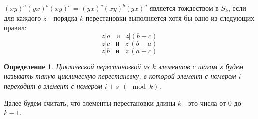 \documentclass[12pt]{article}
\newtheorem{lemma}{Лемма}
\newtheorem{definition}{Определение}
\begin{document}
		$(xy)^a(yx)^b(xy)^c$ = $(yx)^c(xy)^b(yx)^a$ является тождеством в $S_k$, если для каждого $z$ - порядка $k$-перестановки выполняется хотя бы одно из следующих правил:
		\begin{equation} \label{3blocks 1st cond}
		z|a \hspace{10pt} \text{и} \hspace{10pt} z|(b-c)
		\end{equation}
		\begin{equation}
		z|c \hspace{10pt} \text{и} \hspace{10pt} z|(b-a)
		\end{equation}
		\begin{equation} \label{3blocks 3rd cond}
		z|b \hspace{10pt} \text{и} \hspace{10pt} z|(a+c)
		\end{equation}
	
	\begin{definition}
		Циклической перестановкой из $k$ элементов с шагом $s$ будем называть такую циклическую перестановку, в которой элемент с номером $i$ переходит в элемент с номером $i+s \hspace{5pt} (\mod k)$. 
	\end{definition}
	
	Далее будем считать, что элементы перестановки длины $k$ - это числа от $0$ до $k-1$.
	
	\begin{comment}
	\begin{lemma} \label{existence_of_clockwise_and_vv}
		Существуют такие перестановки $x$ и $y$ из $S_k$, что $xy$ - циклическая перестановка с шагом -1, а $yx$ - циклическая перестановка с шагом 1.
	\end{lemma}
	\begin{proof}
		Рассмотрим перестановку $x$: $i \rightarrow -i (\mod k)$ и $y$: $i \rightarrow -i+1 (\mod k)$.
		$$
		x = 
		\begin{pmatrix}
		0&1&2&3&...&k-3&k-2&k-1\\
		0&k-1&k-2&k-3&...&3&2&1
		\end{pmatrix}
		$$
		
		$$
		y = 
		\begin{pmatrix}
		0&1&2&3&...&k-3&k-2&k-1\\
		1&0&k-1&k-2&...&4&3&2
		\end{pmatrix}
		$$
		
		Тогда 
		
		$xy$: $i \xrightarrow y (-i+1) \xrightarrow x (-(-i+1)) == i-1$,
		
		$yx$: $i \xrightarrow x (-i) \xrightarrow y (-(-i)+1) == i+1$
		
	\end{proof}
	\end{comment}
	
\end{document}
